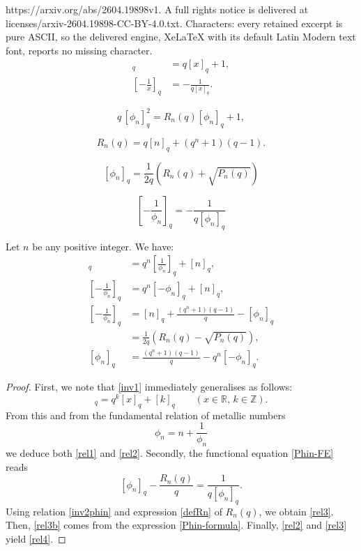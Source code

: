 \documentclass[10pt,a4paper]{amsart}
\let\fr=\frac
\newcommand{\R}{\mathbb{R}}
\newcommand{\Z}{\mathbb{Z}}
\begin{document}
https://arxiv.org/abs/2604.19898v1. A full rights notice is delivered at licenses/arxiv-2604.19898-CC-BY-4.0.txt. Characters: every retained excerpt is pure ASCII, so the delivered engine, XeLaTeX with its default Latin Modern text font, reports no missing character.
\begin{align}
[x+1]_q&=q[x]_q+1,\label{inv1}\\
 \left[-\fr 1{x}\right]_q&=-\fr 1{q[x]_q}.\label{inv2}
\end{align}

\begin{equation}\label{Phin-FE}
q\, [\phi_n]_q^2=R_n(q)[\phi_n]_q+1,
\end{equation}

\begin{equation}\label{defRn}
R_n(q)=q[n]_q+(q^n+1)(q-1).
\end{equation}

\begin{equation}\label{Phin-formula}
	[\phi_n]_q=\frac{1}{2q}\left(R_n(q)+\sqrt{P_n(q)}\right)
\end{equation}

\begin{equation}\label{inv2phin}
 \left[-\fr 1{\phi_n}\right]_q=-\fr 1{q[\phi_n]_q}
\end{equation}

\begin{proposition}
Let $n$ be any positive integer.
We have:
\begin{align}
[\phi_n]_q&=q^n\left[\fr 1{\phi_n}\right]_q+[n]_q, \label{rel1}\\
\left[-\fr 1{\phi_n}\right]_q&=q^n[-\phi_n]_q+[n]_q,\label{rel2}\\
\left[-\fr 1{\phi_n}\right]_q&=[n]_q+\fr{(q^n+1)(q-1)}q -[\phi_n]_q \label{rel3}\\
&=\frac{1}{2q}\left(R_n(q)-\sqrt{P_n(q)}\right),\label{rel3b}\\
[\phi_n]_q&=\fr{(q^n+1)(q-1)}q -q^n [-\phi_n]_q.\label{rel4}
\end{align}
\end{proposition}

\begin{proof}
First, we note that \eqref{inv1} immediately generalises as follows:
\begin{equation*}
[x+k]_q=q^k[x]_q+[k]_q\qquad (x\in\R,\, k\in\Z).
\end{equation*}
From this and from the fundamental relation of metallic numbers
\begin{equation*}
\phi_n=n+\fr 1{\phi_n}
\end{equation*}
we  deduce both \eqref{rel1} and \eqref{rel2}. Secondly, the functional equation \eqref{Phin-FE} reads
\begin{equation}\label{Phin-FE2}
[\phi_n]_q-\fr{R_n(q)}{q}=\fr 1{q[\phi_n]_q}.
\end{equation} 
Using relation \eqref{inv2phin} and  expression \eqref{defRn} of $R_n(q)$, we obtain \eqref{rel3}. Then, \eqref{rel3b} comes from the expression \eqref{Phin-formula}. Finally,  \eqref{rel2} and \eqref{rel3} yield \eqref{rel4}.
\end{proof}
\end{document}

